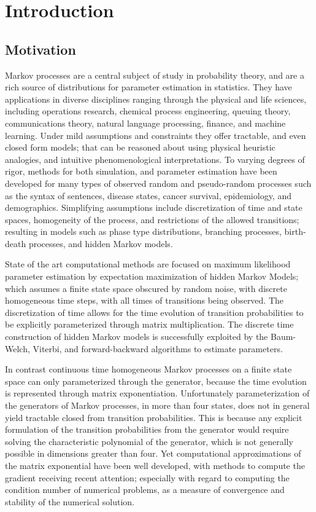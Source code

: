 \chapter{Introduction}
\section{Motivation}
Markov processes are a central subject of study in probability theory, and are a 
rich source of distributions for parameter estimation in statistics\cite{billingsley_probability_1995,rogers_diffusions_2000,rogers_diffusions_2000-1}.
They have applications in diverse disciplines ranging through the physical and 
life sciences, including operations research, chemical process engineering, 
queuing theory, communications theory, natural language processing, finance, and 
machine learning. Under mild assumptions and constraints they offer tractable,
and even closed form models; that can be reasoned about using physical heuristic 
analogies, and intuitive phenomenological interpretations. To varying degrees of 
rigor, methods for both simulation, and parameter estimation have been developed 
for many types of observed random and pseudo-random processes such as the syntax 
of sentences, disease states, cancer survival, epidemiology, and demographics. 
Simplifying assumptions include discretization of time and state spaces, 
homogeneity of the process, and restrictions of the allowed transitions; 
resulting in models such as phase type distributions, branching processes, 
birth-death processes, and hidden Markov models.

State of the art computational methods are focused on maximum likelihood 
parameter estimation by expectation maximization of hidden Markov Models; which 
assumes a finite state space obscured by random noise, with discrete homogeneous 
time steps, with all times of transitions being observed. The discretization of 
time allows for the time evolution of transition probabilities to be explicitly 
parameterized through matrix multiplication. The discrete time construction of
hidden Markov models is successfully exploited by the Baum-Welch, Viterbi, and 
forward-backward algorithms to estimate parameters.

In contrast continuous time homogeneous Markov processes on a finite state space
can only parameterized through the generator, because the time evolution is 
represented through matrix exponentiation. Unfortunately parameterization of the 
generators of Markov processes, in more than four states, does not in general 
yield tractable closed from transition probabilities. This is because any 
explicit formulation of the transition probabilities from the generator would 
require solving the characteristic polynomial of the generator, which is not 
generally possible in dimensions greater than four. Yet computational 
approximations of the matrix exponential have been well developed, with methods 
to compute the gradient receiving recent attention; especially with regard to 
computing the condition number of numerical problems, as a measure of 
convergence and stability of the numerical solution\cite{al-mohy_computing_2009}.

